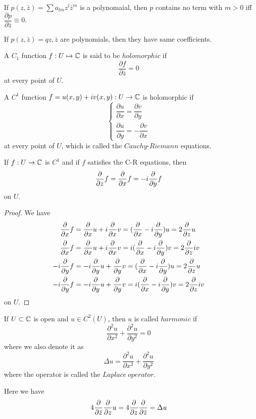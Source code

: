 \begin{proposition}
    If $p(z,\bar{z}) = \sum a_{lm} z^l\bar{z}^m$ is a polynomaial, then $p$ contains no term with $m>0$ iff $\dfrac{\partial p}{\partial \bar{z}} \equiv 0$. 
\end{proposition}

\begin{corollary}
    If $p(z,\bar{z}) = q{z,\bar{z}}$ are polynomials, then they have same coefficients.
\end{corollary}

\begin{definition}
    A $C_1$ function $f:U\mapsto \mathbb{C}$ is said to be $holomorphic$ if
    \[\dfrac{\partial f}{\partial \bar{z}} = 0\]
    at every point of $U$.
\end{definition}

\begin{definition}
    A $C^1$ function $f = u(x,y)+iv(x,y): U \to \mathbb{C}$ is holomorphic if
    \[
    \begin{cases}\dfrac{\partial u}{\partial x} = \dfrac{\partial v}{\partial y} \\
    \dfrac{\partial u}{\partial y} = -\dfrac{\partial v}{\partial x}
    \end{cases}\]
    at every point of $U$, which is called the $Cauchy$-$Riemann$ equations.
\end{definition}

\begin{proposition}
    If $f:U\to\mathbb{C}$ is $C^1$ and if $f$ satisfies the C-R equations, then
    \[\dfrac{\partial}{\partial z} f = \dfrac{\partial}{\partial x} f = -i\dfrac{\partial}{\partial y} f \]
    on $U$.
\end{proposition}
\begin{proof}\par
    We have
    \[
    \begin{aligned}
    \dfrac{\partial}{\partial x} f &= \dfrac{\partial}{\partial x} u + i\dfrac{\partial}{\partial x} v = (\dfrac{\partial}{\partial x} -i\dfrac{\partial}{\partial y}) u = 2\dfrac{\partial}{\partial z} u \\
    \dfrac{\partial}{\partial x} f &= \dfrac{\partial}{\partial x} u + i\dfrac{\partial}{\partial x} v = i(\dfrac{\partial}{\partial x} - i\dfrac{\partial}{\partial y}) v = 2\dfrac{\partial}{\partial z} iv \\
    -i\dfrac{\partial}{\partial y} f &= -i\dfrac{\partial}{\partial y} u + \dfrac{\partial}{\partial y} v = (\dfrac{\partial}{\partial x} -i\dfrac{\partial}{\partial y}) u = 2\dfrac{\partial}{\partial z} u \\
    -i\dfrac{\partial}{\partial y} f &= -i\dfrac{\partial}{\partial y} u + \dfrac{\partial}{\partial y} v = i(\dfrac{\partial}{\partial x} - i\dfrac{\partial}{\partial y}) v = 2\dfrac{\partial}{\partial z} iv \\
    \end{aligned}
    \]
    on $U$.
\end{proof}

\begin{definition}
If $U\subset \mathbb{C}$ is open and $u\in C^2(U)$, then $u$ is called $harmonic$ if
\[\dfrac{\partial^2 u}{\partial x^2}+\dfrac{\partial^2 u}{\partial y^2} = 0\]
where we also denote it as
\[\Delta u = \dfrac{\partial^2 u}{\partial x^2}+\dfrac{\partial^2 u}{\partial y^2}\]
where the operator is called the $Laplace\ operator$.
\end{definition}
Here we have
\[4\dfrac{\partial}{\partial \bar{z}}\dfrac{\partial}{\partial z} u = 4 \dfrac{\partial}{\partial z}\dfrac{\partial}{\partial \bar{z}} = \Delta u\]

